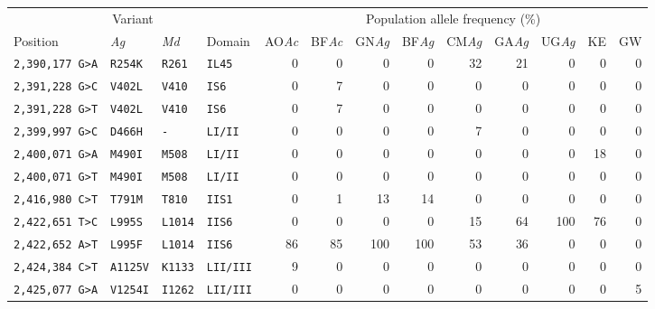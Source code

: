 
\begin{tabular}{llllrrrrrrrrr}
\toprule
\multicolumn{4}{c}{Variant} &
\multicolumn{9}{c}{Population allele frequency (\%)}\\
\cmidrule(r){1-4}
\cmidrule(r){5-13}
Position\tnote{1} & 
\emph{Ag}\tnote{2} & 
\emph{Md}\tnote{3} &
Domain &
AO\emph{Ac} & 
BF\emph{Ac} & 
GN\emph{Ag} & 
BF\emph{Ag} & 
CM\emph{Ag} & 
GA\emph{Ag} & 
UG\emph{Ag} & 
KE & 
GW\\
\midrule

\texttt{2,390,177 G>A} & \texttt{R254K} & \texttt{R261} & \texttt{IL45} & 0 & 0 & 0 & 0 & 32 & 21 & 0 & 0 & 0 \\

\texttt{2,391,228 G>C} & \texttt{V402L} & \texttt{V410} & \texttt{IS6} & 0 & 7 & 0 & 0 & 0 & 0 & 0 & 0 & 0 \\

\texttt{2,391,228 G>T} & \texttt{V402L} & \texttt{V410} & \texttt{IS6} & 0 & 7 & 0 & 0 & 0 & 0 & 0 & 0 & 0 \\

\texttt{2,399,997 G>C} & \texttt{D466H} & \texttt{-} & \texttt{LI/II} & 0 & 0 & 0 & 0 & 7 & 0 & 0 & 0 & 0 \\

\texttt{2,400,071 G>A} & \texttt{M490I} & \texttt{M508} & \texttt{LI/II} & 0 & 0 & 0 & 0 & 0 & 0 & 0 & 18 & 0 \\

\texttt{2,400,071 G>T} & \texttt{M490I} & \texttt{M508} & \texttt{LI/II} & 0 & 0 & 0 & 0 & 0 & 0 & 0 & 0 & 0 \\

\texttt{2,416,980 C>T} & \texttt{T791M} & \texttt{T810} & \texttt{IIS1} & 0 & 1 & 13 & 14 & 0 & 0 & 0 & 0 & 0 \\

\texttt{2,422,651 T>C} & \texttt{L995S} & \texttt{L1014} & \texttt{IIS6} & 0 & 0 & 0 & 0 & 15 & 64 & 100 & 76 & 0 \\

\texttt{2,422,652 A>T} & \texttt{L995F} & \texttt{L1014} & \texttt{IIS6} & 86 & 85 & 100 & 100 & 53 & 36 & 0 & 0 & 0 \\

\texttt{2,424,384 C>T} & \texttt{A1125V} & \texttt{K1133} & \texttt{LII/III} & 9 & 0 & 0 & 0 & 0 & 0 & 0 & 0 & 0 \\

\texttt{2,425,077 G>A} & \texttt{V1254I} & \texttt{I1262} & \texttt{LII/III} & 0 & 0 & 0 & 0 & 0 & 0 & 0 & 0 & 5 \\


\end{tabular}
